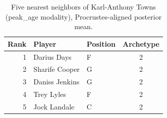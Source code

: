 \begin{table}[htbp]
  \centering\small
  \begin{tabular}{rllc}
    \toprule
    Rank & Player & Position & Archetype \\
    \midrule
    1 & Darius Days & F & 2 \\
    2 & Sharife Cooper & G & 2 \\
    3 & Daniss Jenkins & G & 2 \\
    4 & Trey Lyles & F & 2 \\
    5 & Jock Landale & C & 2 \\
    \bottomrule
  \end{tabular}
  \caption{Five nearest neighbors of Karl-Anthony Towns (peak_age modality), Procrustes-aligned posterior mean.}
  \label{tab:Karl_Anthony_Towns_neighbors_peak_age}
\end{table}

